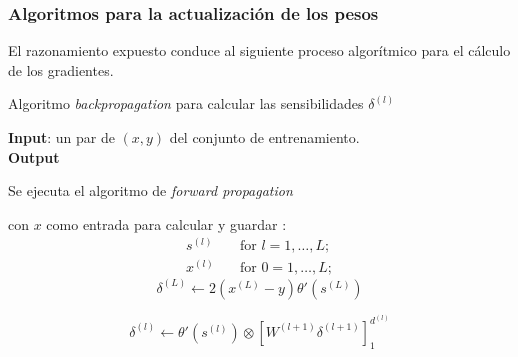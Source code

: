 \subsubsection{Algoritmos para la actualización de los pesos}  

El razonamiento expuesto conduce al siguiente proceso algorítmico 
para el cálculo de los gradientes. 

\begin{algorithm}[H]
    \caption{Algoritmo \textit{backpropagation} para calcular
    las sensibilidades $\delta^{(l)}$}
    \hspace*{\algorithmicindent} \textbf{Input}: un par de $(x,y)$ del conjunto de entrenamiento.  \\
    \hspace*{\algorithmicindent} \textbf{Output} 
    \begin{algorithmic}[1]
        \STATE Se ejecuta el algoritmo de \textit{forward propagation} 
        
        con $x$ como entrada para calcular y guardar : 
        \begin{align}
            s^{(l)} \quad &\text{for } l = 1, \ldots, L;
            \\
            x^{(l)} \quad &\text{for } 0 = 1, \ldots, L;
        \end{align}
        \STATE {}
        \begin{equation}
            \delta^{(L)} \longleftarrow 2
            \left( 
                x^{(L)} - y
            \right)
            \theta' \left( s^{(L)} \right)
        \end{equation}
        \STATE 
        
        {
            \begin{equation}
                \delta^{(l)} 
                    \leftarrow
                \theta' 
                \left(
                    s^{(l)}
                \right)
                \otimes
                \left[
                    W^{(l+1)}
                    \delta^{(l+1)}
                \right]^{d^{(l)}}_1
            \end{equation}
        }
\end{algorithmic}
\end{algorithm}

